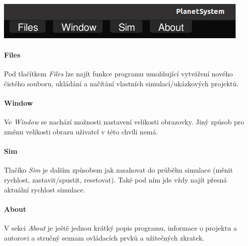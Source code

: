 \documentclass[a4paper, 12pt]{article}
\begin{document}
\begin{center}
\includegraphics[width=0.8\linewidth]{pics/p3_crop.png}
\end{center}

\paragraph{Files}
Pod tlačítkem \emph{Files} lze najít funkce programu umožňující vytváření nového
čistého souboru, ukládání a načítání vlastních simulací/ukázkových projektů.

\paragraph{Window}
Ve \emph{Window} se nachází možnosti nastavení velikosti obrazovky. Jiný způsob
pro změnu velikosti obrazu uživatel v této chvíli nemá.

\paragraph{Sim}
Tlačíko \emph{Sim} je dalším způsobem jak zasahovat do průběhu simulace (měnit
rychlost, zastavit/spustit, resetovat). Také pod ním jde vždy najít přesná
aktuální rychlost simulace.

\paragraph{About}
V sekci \emph{About} je ještě jednou krátký popis programu, informace o
projektu a autorovi a stručný seznam ovládacích prvků a užitečných zkratek.

\pagebreak
\end{document}
